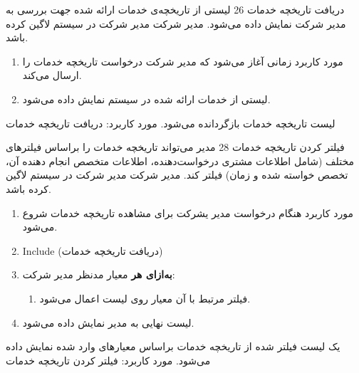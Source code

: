 
{
\usecase
{دریافت تاریخچه خدمات}
{26}
{لیستی از تاریخچه‌ی خدمات ارائه شده جهت بررسی به مدیر شرکت نمایش داده می‌شود.}
{مدیر شرکت}
{}
{مدیر شرکت در سیستم لاگین کرده باشد.}
{
	\vspace*{-0.6cm}
	\begin{enumerate}
		\item مورد کاربرد زمانی آغاز می‌شود که مدیر شرکت درخواست تاریخچه خدمات را ارسال می‌کند.
		\item 
		لیستی از خدمات ارائه شده در سیستم نمایش داده می‌شود.
	\end{enumerate}
}
{لیست تاریخچه خدمات بازگردانده می‌شود.}
{
}
{
	مورد کاربرد: دریافت تاریخچه خدمات
}
}

{
\usecase
{فیلتر کردن تاریخچه خدمات}
{28}
{مدیر می‌تواند تاریخچه خدمات را براساس فیلتر‌های مختلف (شامل اطلاعات مشتری درخواست‌دهنده،‌ اطلاعات متخصص انجام دهنده آن، تخصص خواسته شده و زمان) فیلتر کند. }
{مدیر شرکت}
{}
{مدیر شرکت در سیستم لاگین کرده باشد.}
{
	\vspace*{-0.6cm}
	\begin{enumerate}
		\item مورد کاربرد هنگام درخواست مدیر یشرکت برای مشاهده تاریخچه خدمات شروع می‌شود.
		\item 
		Include (دریافت تاریخچه خدمات)
		\item
		\textbf{به‌ازای هر} معیار مدنظر مدیر شرکت:
		\begin{enumerate}[label=\theenumi.\arabic*.]
			\item فیلتر مرتبط با آن معیار روی لیست اعمال می‌شود.
		\end{enumerate}
		\item لیست نهایی به مدیر نمایش داده می‌شود.
	\end{enumerate}
}
{یک لیست فیلتر شده از تاریخچه خدمات براساس معیارهای وارد شده نمایش داده می‌شود.}
{
}
{
	مورد کاربرد: فیلتر کردن تاریخچه خدمات
}
}
